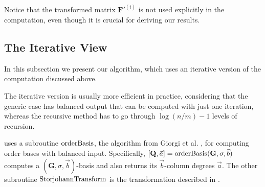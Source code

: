 Notice that the transformed matrix $\mathbf{F}'^{\left(i\right)}$
is not used explicitly in the computation, even though it is crucial
for deriving our results.


\subsection{The Iterative View}

In this subsection we present our algorithm, which uses an iterative
version of the computation discussed above.%
\begin{comment}
The recursive top-down approach of the previous subsection is useful
for giving an overall picture of the computation process. Algorithm
\prettyref{alg:mab} uses an equivalent corresponding bottom-up iterative
approach. 
\end{comment}
\begin{comment}
, allowing the complexity to be more easily analyzed. 
\end{comment}
\begin{comment}
. In practice, bottom-up iterative approaches are more efficient than
the corresponding top-down recursive approaches. For our purpose,
it is also easier to analyze the computational cost of the iterative
procedure. 
\end{comment}
{} The iterative version is usually more efficient in practice, considering
that the generic case has balanced output that can be computed with
just one iteration, whereas the recursive method has to go through
$\log(n/m)-1$ levels of recursion.

 uses a subroutine $\mab$, the algorithm from
Giorgi et al. \citeyearpar{Giorgi2003}, for computing order bases
with balanced input. Specifically, $\left[\mathbf{Q},\vec{a}\right]=\mab(\mathbf{G},\sigma,\vec{b})$
computes a $(\mathbf{G},\sigma,\vec{b})$-basis and also returns its
$\vec{b}$-column degrees $\vec{a}$. The other subroutine $\StorjohannTransform$
is the transformation described in .

